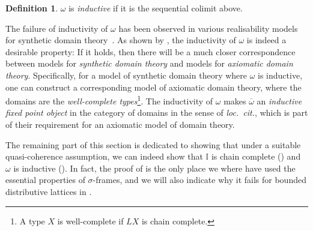 \documentclass[a4paper,12pt]{amsart}
\theoremstyle{definition}
\newtheorem{definition}[theorem]{Definition}
\newcommand{\mbb}[1]{\mathbb{#1}}
\newcommand{\I}{\mbb I}
\newcommand{\ov}[1]{\overline{#1}}
\begin{document}
\begin{definition}
  $\omega$ is \emph{inductive} if it is the sequential colimit above.
\end{definition}
The failure of inductivity of $\omega$ has been observed in various realisability models for synthetic domain theory~\cite{VANOOSTEN2000233}. As shown by \citet{fiore-plotkin:1996}, the inductivity of $\omega$ is indeed a desirable property: If it holds, then there will be a much closer correspondence between models for \emph{synthetic domain theory} and models for \emph{axiomatic domain theory}. Specifically, for a model of synthetic domain theory where $\omega$ is inductive, one can construct a corresponding model of axiomatic domain theory, where the domains are the \emph{well-complete types}\footnote{A type $X$ is well-complete if $LX$ is chain complete.}. The inductivity of $\omega$ makes $\ov\omega$ an \emph{inductive fixed point object} in the category of domains in the sense of \emph{loc.\ cit.}, which is part of their requirement for an axiomatic model of domain theory. 

The remaining part of this section is dedicated to showing that under a suitable quasi-coherence assumption, we can indeed show that $\I$ is chain complete () and $\omega$ is inductive (). In fact, the proof of  is the only place we where have used the essential properties of $\sigma$-frames, and we will also indicate why it fails for bounded distributive lattices in .

\end{document}
